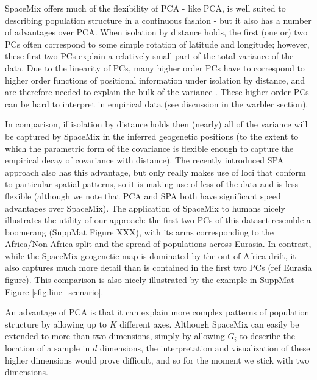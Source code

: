 \documentclass[12pt]{article}
\newcommand{\plr}[1]{{\it\color{purple}{(#1)}}}
\begin{document}

SpaceMix offers much of the flexibility of PCA - like PCA, is well suited to describing population structure in a continuous fashion - 
but it also has a number of advantages over PCA. 
When isolation by distance holds, the first (one or) two PCs often correspond to some simple rotation of latitude and longitude; 
however, these first two PCs explain a relatively small part of the total variance of the data. 
Due to the linearity of PCs, many higher order PCs 
have to correspond to higher order functions of positional information under isolation by distance, 
and are therefore needed to explain the bulk of the variance \citep{novembre_interpreting_2008}. 
These higher order PCs can be hard to interpret in empirical data (see discussion in the warbler section).

In comparison, if isolation by distance holds then (nearly) all of the variance will be captured by SpaceMix in the inferred geogenetic positions 
(to the extent to which the parametric form of the covariance is flexible enough to capture the empirical decay of covariance with distance). 
The recently introduced SPA approach \citep{yang_model-based_2012} also has this advantage, 
but only really makes use of loci that conform to particular spatial patterns,
so it is making use of less of the data and is less flexible 
(although we note that PCA and SPA both have significant speed advantages over SpaceMix).  
The application of SpaceMix to humans nicely illustrates the utility of our approach: 
the first two PCs of this dataset resemble a boomerang (SuppMat Figure XXX), 
with its arms corresponding to the Africa/Non-Africa split and the spread of populations across Eurasia. 
In contrast, while the SpaceMix geogenetic map is dominated by the out of Africa drift, 
it also captures much more detail than is contained in the first two PCs (ref Eurasia figure).
This comparison is also nicely illustrated by the example in SuppMat Figure \ref{sfig:line_scenario}.

An advantage of PCA is that it can explain more complex patterns of population structure by allowing up to $K$ different axes.
Although SpaceMix can easily be extended to more than two dimensions, 
simply by allowing $G_i$ to describe the location of a sample in $d$ dimensions, 
the interpretation and visualization of these higher dimensions would prove difficult, 
and so for the moment we stick with two dimensions.
\end{document}
